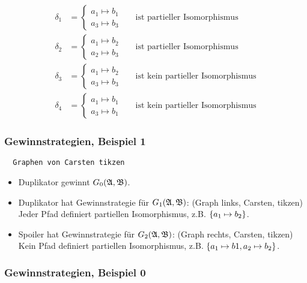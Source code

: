 \begin{align*}
  \delta_1 &= \begin{cases}
    a_1 \mapsto b_1 \\
    a_3 \mapsto b_3
  \end{cases} && \text{ist partieller Isomorphismus} \\
  \delta_2 &= \begin{cases}
    a_1 \mapsto b_2 \\
    a_2 \mapsto b_3
  \end{cases} && \text{ist partieller Isomorphismus} \\
  \delta_3 &= \begin{cases}
    a_1 \mapsto b_2 \\
    a_3 \mapsto b_3
  \end{cases} && \text{ist kein partieller Isomorphismus} \\
  \delta_4 &= \begin{cases}
    a_1 \mapsto b_1 \\
    a_3 \mapsto b_1
  \end{cases} && \text{ist kein partieller Isomorphismus}
\end{align*}

\subsubsection{Gewinnstrategien, Beispiel 1}

\begin{verbatim}
  Graphen von Carsten tikzen
\end{verbatim}

\begin{itemize}
  \item Duplikator gewinnt $G_0(\mathfrak{A}, \mathfrak{B})$.
  
  \item Duplikator hat Gewinnstrategie für $G_1(\mathfrak{A},\mathfrak{B})$: (Graph links, Carsten, tikzen)\\
  Jeder Pfad definiert partiellen Isomorphismus, z.B. $\left\{a_1\mapsto b_2\right\}$.
  
  \item Spoiler hat Gewinnstrategie für $G_2(\mathfrak{A},\mathfrak{B})$: (Graph rechts, Carsten, tikzen)\\
  Kein Pfad definiert partiellen Isomorphismus, z.B. $\left\{a_1\mapsto b1, a_2\mapsto b_2\right\}$.
\end{itemize}

\subsubsection{Gewinnstrategien, Beispiel 0}

